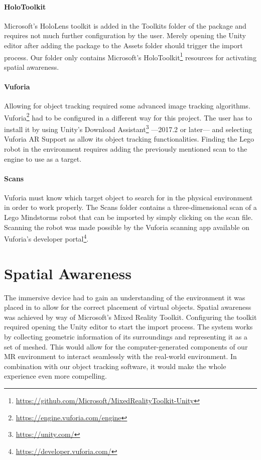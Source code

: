 \paragraph{HoloToolkit}
Microsoft's HoloLens toolkit is added in the Toolkits folder of the package and requires not much further configuration by the user. Merely opening the Unity editor after adding the package to the Assets folder should trigger the import process. Our folder only contains Microsoft's HoloToolkit\footnote{\protect\url{https://github.com/Microsoft/MixedRealityToolkit-Unity}} resources for activating spatial awareness. 

\paragraph{Vuforia}
Allowing for object tracking required some advanced image tracking algorithms. Vuforia\footnote{\protect\url{https://engine.vuforia.com/engine}} had to be configured in a different way for this project. The user has to install it by using Unity's Download Assistant\footnote{\protect\url{https://unity.com/}} ---2017.2 or later--- and selecting Vuforia AR Support as allow its object tracking functionalities. Finding the Lego robot in the environment requires adding the previously mentioned scan to the engine to use as a target.

\paragraph{Scans}
Vuforia must know which target object to search for in the physical environment in order to work properly. The Scans folder contains a three-dimensional scan of a Lego Mindstorms robot that can be imported by simply clicking on the scan file. Scanning the robot was made possible by the Vuforia scanning app available on Vuforia's developer portal\footnote{\protect\url{https://developer.vuforia.com/}}.

\section{Spatial Awareness}
The immersive device had to gain an understanding of the environment it was placed in to allow for the correct placement of virtual objects. Spatial awareness was achieved by way of Microsoft's Mixed Reality Toolkit. Configuring the toolkit required opening the Unity editor to start the import process. The system works by collecting geometric information of its surroundings and representing it as a set of meshed. This would allow for the computer-generated components of our MR environment to interact seamlessly with the real-world environment. In combination with our object tracking software, it would make the whole experience even more compelling.

